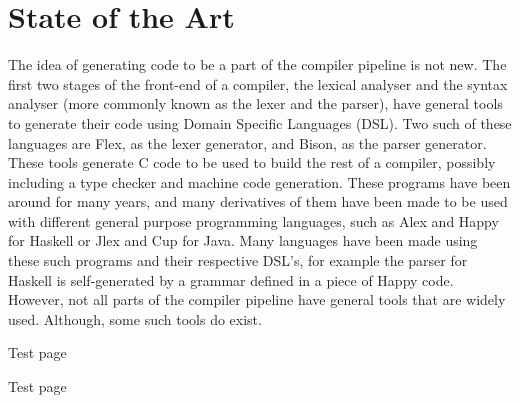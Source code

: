 \chapter{State of the Art}

The idea of generating code to be a part of the compiler pipeline is not new.
The first two stages of the front-end of a compiler, the lexical analyser and the syntax analyser (more commonly known as the lexer and the parser), have general tools to generate their code using Domain Specific Languages (DSL)\cite{Bentley:1986:PPL:6424.315691,van2000domain}.
Two such of these languages are Flex\cite{Levine:2009:FB:1696439}, as the lexer generator, and Bison\cite{Levine:2009:FB:1696439}, as the parser generator.
These tools generate C code to be used to build the rest of a compiler, possibly including a type checker and machine code generation.
These programs have been around for many years, and many derivatives of them have been made to be used with different general purpose programming languages, such as Alex and Happy for Haskell or Jlex and Cup for Java\cite{ranta2012implementing}.
Many languages have been made using these such programs and their respective DSL's, for example the parser for Haskell is self-generated by a grammar defined in a piece of Happy code.
However, not all parts of the compiler pipeline have general tools that are widely used.
Although, some such tools do exist\cite{grimm2007typical,ruler}.



\pagebreak
Test page

\pagebreak
Test page